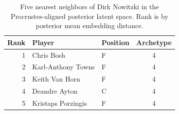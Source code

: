 \begin{table}[htbp]
  \centering\small
  \begin{tabular}{rllc}
    \toprule
    Rank & Player & Position & Archetype \\
    \midrule
    1 & Chris Bosh & F & 4 \\
    2 & Karl-Anthony Towns & F & 4 \\
    3 & Keith Van Horn & F & 4 \\
    4 & Deandre Ayton & C & 4 \\
    5 & Kristaps Porzingis & F & 4 \\
    \bottomrule
  \end{tabular}
  \caption{Five nearest neighbors of Dirk Nowitzki in the Procrustes-aligned posterior latent space. Rank is by posterior mean embedding distance.}
  \label{tab:Dirk_Nowitzki_neighbors}
\end{table}

